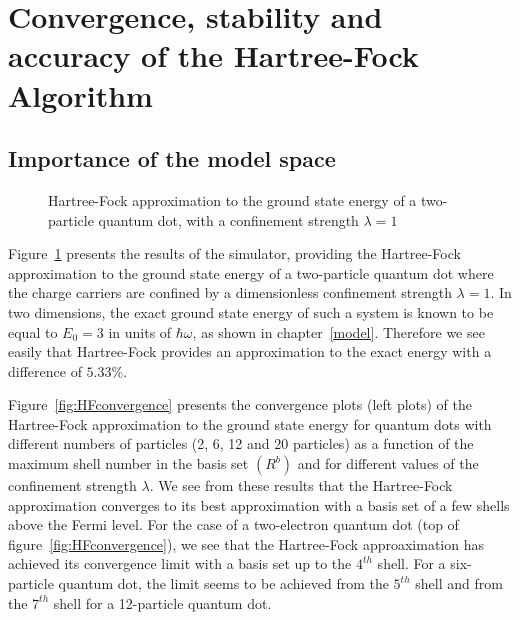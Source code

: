 


\section{Convergence, stability and accuracy of the Hartree-Fock Algorithm}
\label{sec:scalingSimulator}

\subsection{Importance of the model space}
\label{subsec:errorGrowth}



\begin{figure}
\centering
\scalebox{0.7}{}
\caption{\label{fig:HF_R01new} Hartree-Fock approximation to the ground state energy of a two-particle quantum dot, with a confinement strength $\lambda=1$}
\end{figure}


Figure~\ref{fig:HF_R01new} presents the results of the simulator, providing the Hartree-Fock approximation to the ground state energy of a two-particle quantum dot where the charge carriers are confined by a dimensionless confinement strength $\lambda=1$. In two dimensions, the exact ground state energy of such a system is known to be equal to $E_0=3$ in units of $\hbar \omega$, as shown in chapter~\ref{model}. Therefore we see easily that Hartree-Fock provides an approximation to the exact energy with a difference of $5.33\%$.

Figure~\ref{fig:HFconvergence} presents the convergence plots (left plots) of the Hartree-Fock approximation to the ground state energy for quantum dots with different numbers of particles (2, 6, 12 and 20 particles) as a function of the maximum shell number in the basis set $(R^b)$ and for different values of the confinement strength $\lambda$. We see from these results that the Hartree-Fock approximation 
converges to its best approximation with a basis set of a few shells above the Fermi level. For the case of a two-electron quantum dot (top of figure~\ref{fig:HFconvergence}), we see that the Hartree-Fock approaximation has achieved its convergence limit with a basis set up to the $4^{th}$ shell. For a six-particle quantum dot, the limit seems to be achieved from the $5^{th}$ shell and from the $7^{th}$ shell for a 12-particle quantum dot.

